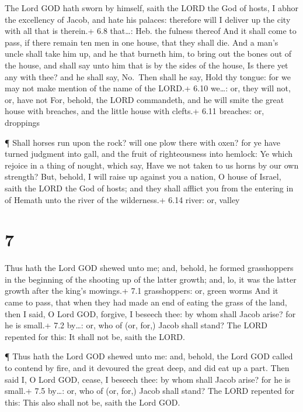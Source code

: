  The Lord GOD hath sworn by himself, saith the LORD the God
of hosts, I abhor the excellency of Jacob, and hate his palaces:
therefore will I deliver up the city with all that is therein.+ 6.8
that\ldots: Heb. the fulness thereof  And it shall come to
pass, if there remain ten men in one house, that they shall die.
 And a man's uncle shall take him up, and he that burneth
him, to bring out the bones out of the house, and shall say unto him
that is by the sides of the house, Is there yet any with thee? and he
shall say, No.~Then shall he say, Hold thy tongue: for we may not make
mention of the name of the LORD.+ 6.10 we\ldots: or, they will not, or,
have not  For, behold, the LORD commandeth, and he will
smite the great house with breaches, and the little house with clefts.+
6.11 breaches: or, droppings

 ¶ Shall horses run upon the rock? will one plow there with
oxen? for ye have turned judgment into gall, and the fruit of
righteousness into hemlock:  Ye which rejoice in a thing of
nought, which say, Have we not taken to us horns by our own strength?
 But, behold, I will raise up against you a nation, O house
of Israel, saith the LORD the God of hosts; and they shall afflict you
from the entering in of Hemath unto the river of the wilderness.+ 6.14
river: or, valley

\hypertarget{section-6}{%
\section{7}\label{section-6}}

 Thus hath the Lord GOD shewed unto me; and, behold, he
formed grasshoppers in the beginning of the shooting up of the latter
growth; and, lo, it was the latter growth after the king's mowings.+ 7.1
grasshoppers: or, green worms  And it came to pass, that
when they had made an end of eating the grass of the land, then I said,
O Lord GOD, forgive, I beseech thee: by whom shall Jacob arise? for he
is small.+ 7.2 by\ldots: or, who of (or, for,) Jacob shall stand?
 The LORD repented for this: It shall not be, saith the
LORD.

 ¶ Thus hath the Lord GOD shewed unto me: and, behold, the
Lord GOD called to contend by fire, and it devoured the great deep, and
did eat up a part.  Then said I, O Lord GOD, cease, I
beseech thee: by whom shall Jacob arise? for he is small.+ 7.5 by\ldots:
or, who of (or, for,) Jacob shall stand?  The LORD repented
for this: This also shall not be, saith the Lord GOD.

